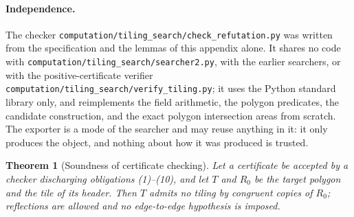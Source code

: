 \documentclass[11pt]{amsart}
\newtheorem{theorem}{Theorem}
\theoremstyle{definition}
\theoremstyle{remark}
\newcommand{\pathcode}[1]{\nolinkurl{#1}}
\begin{document}
\paragraph{Independence.}
The checker \pathcode{computation/tiling_search/check_refutation.py} was
written from the specification and the lemmas of this appendix alone.  It
shares no code with \pathcode{computation/tiling_search/searcher2.py}, with
the earlier searchers, or with the positive-certificate verifier
\pathcode{computation/tiling_search/verify_tiling.py}; it uses the Python
standard library only, and reimplements the field arithmetic, the polygon
predicates, the candidate construction, and the exact polygon intersection
areas from scratch.  The exporter is a mode of the searcher and may reuse
anything in it: it only produces the object, and nothing about how it was
produced is trusted.

\begin{theorem}[Soundness of certificate checking]\label{thm:cert-sound}
Let a certificate be accepted by a checker discharging obligations
\textup{(1)--(10)}, and let $T$ and $R_0$ be the target polygon and the tile
of its header.  Then $T$ admits no tiling by congruent copies of $R_0$;
reflections are allowed and no edge-to-edge hypothesis is imposed.
\end{theorem}
\end{document}
